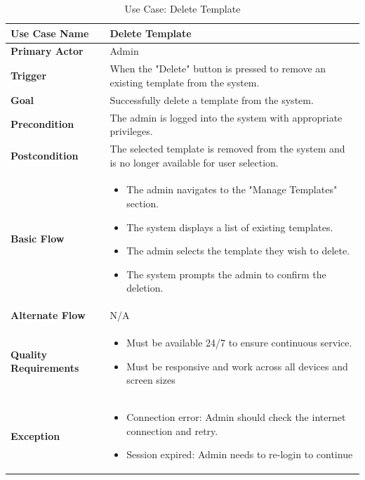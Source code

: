 \documentclass[12pt]{report}
\begin{document}
\clearpage
\begin{table}[h!]

\begin{tabular}{|p{3.5cm}|p{10cm}|}
\hline
\textbf{Use Case Name} & Delete Template \\ 
\hline
\textbf{Primary Actor} & Admin \\ 
\hline
\textbf{Trigger} & When the "Delete" button is pressed to remove an existing template from the system. \\ 
\hline
\textbf{Goal} & Successfully delete a template from the system. \\ 
\hline
\textbf{Precondition} & The admin is logged into the system with appropriate privileges. \\ 
\hline
\textbf{Postcondition} & The selected template is removed from the system and is no longer available for user selection. \\ 
\hline
\textbf{Basic Flow} & 
\begin{itemize}
    \item The admin navigates to the "Manage Templates" section.
    \item The system displays a list of existing templates.
    \item The admin selects the template they wish to delete.
    \item The system prompts the admin to confirm the deletion.

\end{itemize} \\ 
\hline
\textbf{Alternate Flow} & N/A \\ 
\hline
\textbf{Quality Requirements} & 
\begin{itemize}
    \item Must be available 24/7 to ensure continuous service.
    \item Must be responsive and work across all devices and screen sizes
\end{itemize} \\ 
\hline
\textbf{Exception} & 
\begin{itemize}
    \item Connection error: Admin should check the internet connection and retry.
    \item Session expired: Admin needs to re-login to continue
\end{itemize} \\ 
\hline
\end{tabular}

\caption{Use Case: Delete Template}
\end{table}
\end{document}
